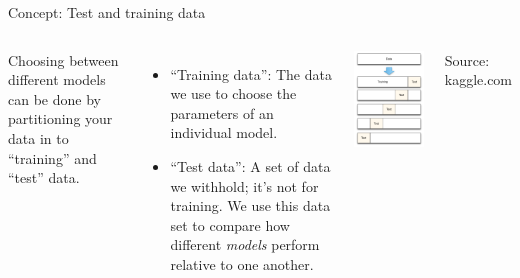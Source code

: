 \documentclass[aspectratio=169, handout]{beamer}
\begin{document}
\begin{frame}{Concept:  Test and training data}


\begin{columns}


Choosing between different models can be done by partitioning your data in to ``training'' and ``test'' data.

\begin{itemize}
\item ``Training data'': The data we use to choose the parameters of an individual model. 

\hspace{5mm}

\item ``Test data'': A set of data we withhold; it's not for training.  We use this data set to compare how different \textit{models} perform relative to one another.  

\end{itemize}

\includegraphics[scale=0.35]{figures/07_cross_validation_diagram}
\begin{tiny}
Source: kaggle.com
\end{tiny}
\end{columns}


\end{frame}
\end{document}
